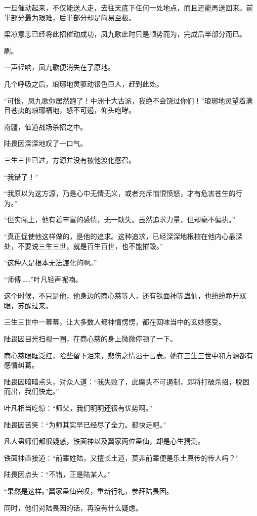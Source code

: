 \begin{this_body}
一旦催动起来，不仅能送人走，去往天底下任何一处地点，而且还能再送回来。前半部分最为艰难，后半部分却是简易至极。

梁凉意志已经将此招催动成功，凤九歌此时只是顺势而为，完成后半部分而已。

刷。

一声轻响，凤九歌便消失在了原地。

几个呼吸之后，琅琊地灵驱动银色巨人，赶到此处。

“可恨，凤九歌你居然跑了！中洲十大古派，我绝不会饶过你们！”琅琊地灵望着满目苍夷的琅琊福地，怒不可遏，仰头咆哮。

南疆，仙道战场杀招之中。

陆畏因深深地叹了一口气。

三生三世已过，方源并没有被他渡化感召。

“我错了！”

“我原以为这方源，乃是心中无情无义，或者充斥憎恨愤怒，才有危害苍生的行为。”

“但实际上，他有着丰富的感情，无一缺失。虽然追求力量，但却毫不偏执。”

“真正促使他这样做的，是他的追求。这种追求，已经深深地根植在他内心最深处，不要说三生三世，就是百生百世，也不能摧毁。”

“这种人是根本无法渡化的啊。”

“师傅……”叶凡轻声呢喃。

这个时候，不只是他，他身边的商心慈等人，还有铁面神等蛊仙，也纷纷睁开双眼，苏醒过来。

三生三世中一幕幕，让大多数人都神情愣愣，都在回味当中的玄妙感受。

陆畏因目光扫视一圈，在商心慈的身上微微停顿了一下。

商心慈眼眶泛红，险些留下泪来，悲伤之情溢于言表。她在三生三世中和方源都有感情纠葛。

陆畏因暗暗点头，对众人道：“我失败了，此魔头不可遏制，即将打破杀招，脱困而出，我们快走。”

叶凡相当吃惊：“师父，我们明明还很有优势啊。”

陆畏因苦笑：“为师其实早已经尽了全力。都快走吧。”

凡人蛊师们都很疑惑，铁面神以及翼家两位蛊仙，却是心生猜测。

铁面神直接道：“前辈姓陆，又擅长土道，莫非前辈便是乐土真传的传人吗？”

陆畏因点头：“不错，正是陆某人。”

“果然是这样。”翼家蛊仙兴叹，重新行礼，参拜陆畏因。

同时，他们对陆畏因的话，再没有什么疑虑。


\end{this_body}
